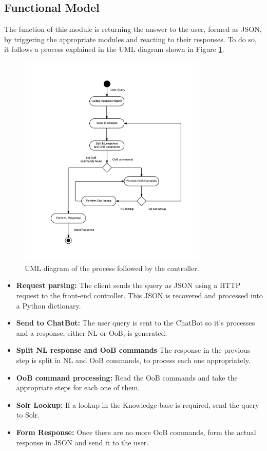 \subsection{Functional Model}
\label{subsec:functmodel}

The function of this module is returning the answer to the user, formed as JSON, by triggering the appropriate modules and reacting to their responses. To do so, it follows a process explained in the UML diagram shown in Figure \ref{fig:fe-model1}.

\begin{figure}[!htbp]
    \centering
    \includegraphics[width=0.8\textwidth]{img/prot/activityDiagram.png} 
    \caption{UML diagram of the process followed by the controller.}
    \label{fig:fe-model1}
\end{figure}

\begin{itemize}
 \item \textbf{Request parsing:} The client sends the query as JSON using a HTTP request to the front-end controller. This JSON is recovered and processed into a Python dictionary.
 \item \textbf{Send to ChatBot:} The user query is sent to the ChatBot so it's processes and a response, either \ac{NL} or \ac{OoB}, is generated.
 \item \textbf{Split \ac{NL} response and \ac{OoB} commands} The response in the previous step is split in \ac{NL} and {OoB} commands, to process each one appropriately.
 \item \textbf{\ac{OoB} command processing:} Read the \ac{OoB} commands and take the appropriate steps for each one of them.
 \item \textbf{Solr Lookup:} If a lookup in the Knowledge base is required, send the query to Solr.
 \item \textbf{Form Response:} Once there are no more \ac{OoB} commands, form the actual response in JSON and send it to the user.
\end{itemize}

